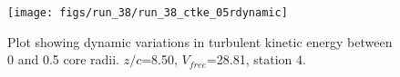 \begin{figure}[H]
\centering
\texttt{[image: figs/run\_38/run\_38\_ctke\_05rdynamic]}
\caption{Plot showing dynamic variations in turbulent kinetic energy between 0 and 0.5 core radii. $z/c$=8.50, $V_{free}$=28.81, station 4.}
\label{fig:run_38_ctke_05rdynamic}
\end{figure}


